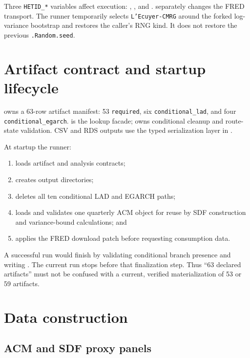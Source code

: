 \documentclass[11pt]{article}
\begin{document}
Three \texttt{HETID\_*} variables affect execution:
, , and
.  separately changes the FRED
transport. The runner temporarily selects \texttt{L'Ecuyer-CMRG} around the
forked log-variance bootstrap and restores the caller's RNG kind. It does not
restore the previous \texttt{.Random.seed}.

\section{Artifact contract and startup lifecycle}

\begin{sloppypar}
 owns a 63-row artifact manifest:
53 \texttt{required}, six \texttt{conditional\_lad}, and four
\texttt{conditional\_egarch}.  is the lookup facade;
 owns conditional cleanup and route-state
validation. CSV and RDS outputs use the typed serialization layer in
.
\end{sloppypar}

At startup the runner:

\begin{enumerate}[leftmargin=1.5em]
  \item loads artifact and analysis contracts;
  \item creates output directories;
  \item deletes all ten conditional LAD and EGARCH paths;
  \item loads and validates one quarterly ACM object for reuse by SDF
    construction and variance-bound calculations; and
  \item applies the FRED download patch before requesting consumption data.
\end{enumerate}

A successful run would finish by validating conditional branch presence and
writing . The current run
stops before that finalization step. Thus ``63 declared artifacts'' must not
be confused with a current, verified materialization of 53 or 59 artifacts.

\section{Data construction}

\subsection{ACM and SDF proxy panels}
\end{document}
